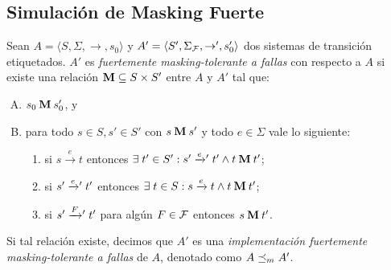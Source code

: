 \subsection{Simulación de Masking Fuerte}
\begin{definition} \label{def:masking_rel}
  Sean $A =\langle S, \Sigma, \rightarrow, s_0\rangle$ y $A' =\langle S', \Sigma_{\mathcal{F}}, \rightarrow', s_0' \rangle$ dos sistemas de transición etiquetados.
  $A'$ es \emph{fuertemente masking-tolerante a fallas} con respecto a $A$ si existe una relación 
$\mathbin{\mathbf{M}} \subseteq S \times S'$ entre $A$ y $A'$ tal que:

\begin{enumerate}[(A)]
  \item $s_0 \mathbin{\mathbf{M}} s'_0$, y
  \item para todo $s \in S, s' \in S'$ con $s \mathbin{\mathbf{M}} s'$ y todo $e \in \Sigma$ vale lo siguiente:

  \begin{enumerate}[(1)]
    \item 
    si $s \xrightarrow{e} t$ entonces
    $\exists\; t' \in S': s' \mathrel{{\xrightarrow[]{e}}{}'} t'  \wedge t \mathbin{\mathbf{M}} t'$;

      \item si $s' \mathrel{{\xrightarrow[]{e}}{}'} t'$ entonces
      $\exists \; t \in S: s \xrightarrow{e} t \wedge t \mathbin{\mathbf{M}} t'$;

      \item si $s' \mathrel{{\xrightarrow[]{F}}{}'} t' $ para algún $F \in \mathcal{F}$ entonces
      $s \mathbin{\mathbf{M}} t'$.
      
  \end{enumerate}
\end{enumerate}

Si tal relación existe, decimos que $A'$ es una \emph{implementación fuertemente masking-tolerante a fallas} de $A$, denotado como $A \preceq_{m} A'$. 
\end{definition}

